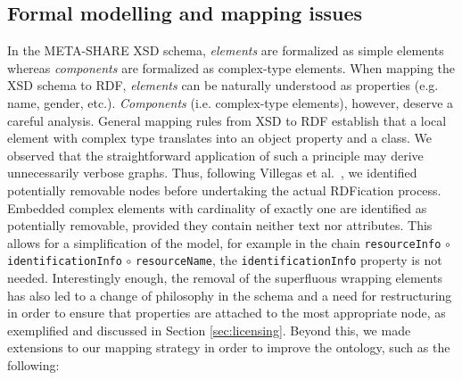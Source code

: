 \documentclass{llncs}
\begin{document}
\subsection{Formal modelling and mapping issues}
\label{sec:mapping}
In the META-SHARE XSD schema, \emph{elements} are formalized as simple elements
whereas \emph{components} are formalized as complex-type elements. When mapping
the XSD schema to RDF, \emph{elements} can be naturally understood as properties
(e.g. name, gender, etc.). \emph{Components} (i.e. complex-type elements),
however, deserve a careful analysis. General mapping rules from XSD to RDF
establish that a local element with complex type translates into an object
property and a class. We observed that the straightforward application of such a
principle may derive unnecessarily verbose graphs. Thus,
following Villegas et al.~\cite{Villegas2014}, we identified potentially removable nodes before
undertaking the actual RDFication process. Embedded complex elements with
cardinality of exactly one are identified as potentially removable, provided they contain
neither text nor attributes. This allows for a simplification of the model, for
example in the chain {\tt resourceInfo} $\circ$ {\tt identificationInfo}
$\circ$ {\tt resourceName}, the {\tt identificationInfo} property is not needed.
Interestingly enough, the removal of the superfluous wrapping elements has also
led to a change of philosophy in the schema and a need for restructuring in order to ensure that properties are attached to the most appropriate node, as exemplified and discussed in Section \ref{sec:licensing}.
Beyond this, we made extensions to our mapping strategy in order to improve the ontology, such as the following:
\end{document}
